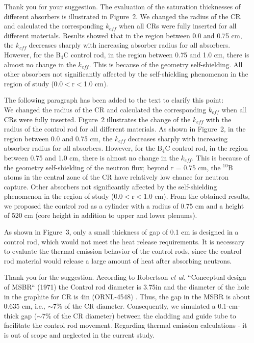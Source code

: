 \documentclass[answers,11pt]{exam}
\begin{document}
\begin{questions}
\begin{solution}
 	 Thank you for your suggestion. The evaluation of the saturation thicknesses of different absorbers is illustrated in Figure~2. 	
	 We changed the radius of the CR and calculated the corresponding $k_{eff}$ when all CRs were fully inserted for all different materials. Results showed that in the region between 0.0 and 0.75 cm, the $k_{eff}$ decreases sharply with increasing absorber radius for all absorbers. However, for the B$_4$C control rod, in the region between 0.75 and 1.0 cm, there is almost no change in the $k_{eff}$. This is because of the geometry self-shielding. All other absorbers not significantly affected by the self-shielding phenomenon in the region of study (0.0$<$r$<$1.0 cm). 
	 
	 The following paragraph has been added to the text to clarify this point:\\
	
     We changed the radius of the CR and calculated the corresponding $k_{eff}$ when all CRs were fully inserted. Figure~2 illustrates the change of the $k_{eff}$ with the radius of the control rod for all different materials. As shown in Figure~2, in the region between 0.0 and 0.75 cm, the $k_{eff}$ decreases sharply with increasing absorber radius for all absorbers. However, for the B$_4$C control rod, in the region between 0.75 and 1.0 cm, there is almost no change in the $k_{eff}$. This is because of the geometry self-shielding of the neutron flux; beyond r = 0.75 cm, the $^{10}$B atoms in the central zone of the CR have relatively low chance for neutron capture. Other absorbers not significantly affected by the self-shielding phenomenon in the region of study (0.0$<$r$<$1.0 cm). From the obtained results, we proposed the control rod as a cylinder with a radius of 0.75 cm and a height of 520 cm (core height in addition to upper and lower plenums).
	 
     
\end{solution}

\question As shown in Figure~3, only a small thickness of gap of 0.1 cm is designed in a control rod, which would not meet the heat release requirements. It is necessary to evaluate the thermal emission behavior of the control rods, since the control rod material would release a large amount of heat after absorbing neutrons.
\begin{solution}
	
    Thank you for the suggestion. According to Robertson \emph{et al.} ``Conceptual design of MSBR`` (1971) the Control rod diameter is 3.75in and the diameter of the hole in the graphite for CR is 4in (ORNL-4548) \cite{robertson_conceptual_1971}. Thus, the gap in the MSBR is about 0.635 cm, i.e., $\sim$7\% of the CR diameter. Consequently, we simulated a 0.1-cm-thick gap ($\sim$7\% of the CR diameter) between the cladding and guide tube to facilitate the control rod movement. Regarding thermal emission calculations - it is out of scope and neglected in the current study.
	

\end{solution}
\end{questions}
\end{document}

